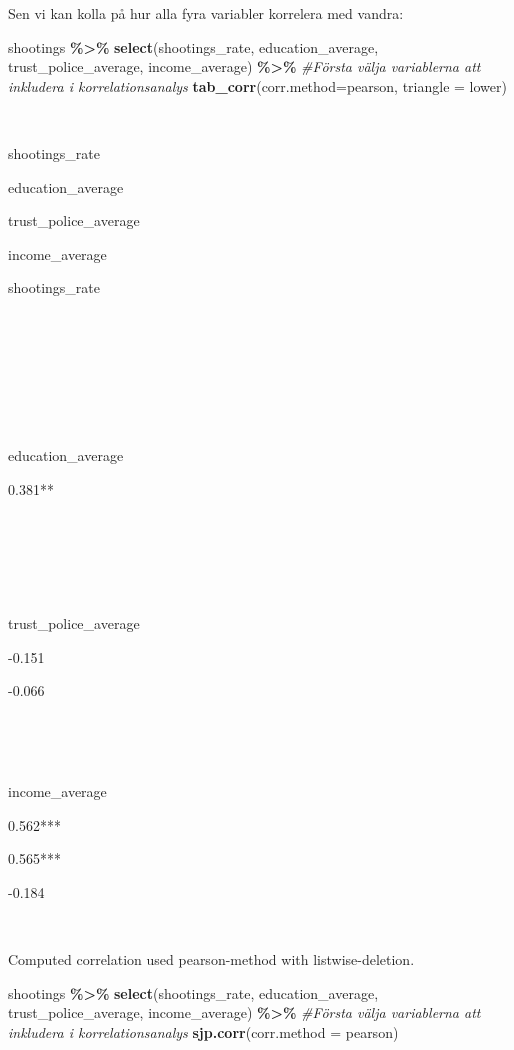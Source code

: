 \documentclass[
]{book}
\newenvironment{Shaded}{\begin{snugshade}}{\end{snugshade}}
\newcommand{\AttributeTok}[1]{\textcolor[rgb]{0.13,0.29,0.53}{#1}}
\newcommand{\CommentTok}[1]{\textcolor[rgb]{0.56,0.35,0.01}{\textit{#1}}}
\newcommand{\FunctionTok}[1]{\textcolor[rgb]{0.13,0.29,0.53}{\textbf{#1}}}
\newcommand{\NormalTok}[1]{#1}
\newcommand{\SpecialCharTok}[1]{\textcolor[rgb]{0.81,0.36,0.00}{\textbf{#1}}}
\newcommand{\StringTok}[1]{\textcolor[rgb]{0.31,0.60,0.02}{#1}}
\begin{document}
Sen vi kan kolla på hur alla fyra variabler korrelera med vandra:

\begin{Shaded}
\begin{Highlighting}[]
\NormalTok{shootings }\SpecialCharTok{\%\textgreater{}\%} 
  \FunctionTok{select}\NormalTok{(shootings\_rate, education\_average, trust\_police\_average, income\_average) }\SpecialCharTok{\%\textgreater{}\%} \CommentTok{\#Första välja variablerna att inkludera i korrelationsanalys}
  \FunctionTok{tab\_corr}\NormalTok{(}\AttributeTok{corr.method=}\StringTok{\textquotesingle{}pearson\textquotesingle{}}\NormalTok{, }\AttributeTok{triangle =} \StringTok{\textquotesingle{}lower\textquotesingle{}}\NormalTok{)}
\end{Highlighting}
\end{Shaded}

~

shootings\_rate

education\_average

trust\_police\_average

income\_average

shootings\_rate

~

~

~

~

education\_average

0.381**

~

~

~

trust\_police\_average

-0.151{}

-0.066{}

~

~

income\_average

0.562***

0.565***

-0.184{}

~

Computed correlation used pearson-method with listwise-deletion.

\begin{Shaded}
\begin{Highlighting}[]
\NormalTok{shootings }\SpecialCharTok{\%\textgreater{}\%} 
  \FunctionTok{select}\NormalTok{(shootings\_rate, education\_average, trust\_police\_average, income\_average) }\SpecialCharTok{\%\textgreater{}\%} \CommentTok{\#Första välja variablerna att inkludera i korrelationsanalys}
  \FunctionTok{sjp.corr}\NormalTok{(}\AttributeTok{corr.method =} \StringTok{\textquotesingle{}pearson\textquotesingle{}}\NormalTok{)}
\end{Highlighting}
\end{Shaded}
\end{document}

